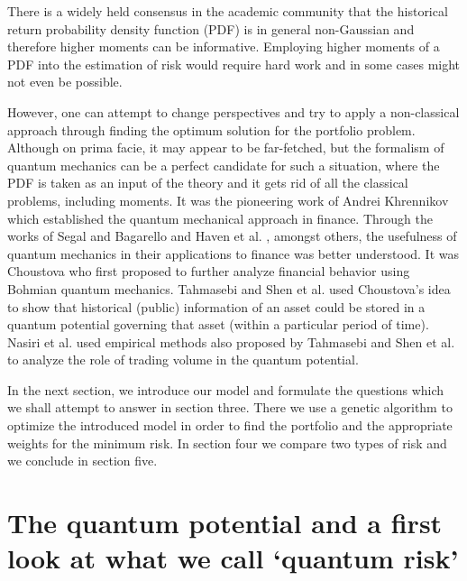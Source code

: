 \documentclass[journal,article,submit,moreauthors,pdftex]{Definitions/mdpi}
\begin{document}
There is a widely held consensus in the academic community that the
historical return probability density function (PDF) is in general
non-Gaussian and therefore higher moments can be informative. Employing
higher moments of a PDF into the estimation of risk would require hard work
and in some cases might not even be possible.

However, one can attempt to change perspectives and try to apply a
non-classical approach through finding the optimum solution for the
portfolio problem. Although on prima facie, it may appear to be far-fetched,
but the formalism of quantum mechanics can be a perfect candidate for such a
situation, where the PDF is taken as an input of the theory and it gets rid
of all the classical problems, including moments. It was the pioneering work
of Andrei Khrennikov \cite{AKhrennikov1}\cite{AKhrennikov2} which
established the quantum mechanical approach in finance. Through the works of
Segal \cite{Segal} and Bagarello \cite{FBagarello1}\cite{FBagarello2} and
Haven et al. \cite{Haven}, amongst others, the usefulness of quantum
mechanics in their applications to finance was better understood. It was
Choustova \cite{Choustova1} who first proposed to further analyze financial
behavior using Bohmian quantum mechanics. Tahmasebi \cite{Tahmasebi} and
Shen et al.\cite{Shen} used Choustova's idea to show that historical
(public) information of an asset could be stored in a quantum potential
governing that asset (within a particular period of time). Nasiri et al.\cite%
{Nasiri1}\cite{Nasiri2} used empirical methods also proposed by Tahmasebi
and Shen et al. \cite{Shen} to analyze the role of trading volume in the
quantum potential.

In the next section, we introduce our model and formulate the questions
which we shall attempt to answer in section three. There we use a genetic
algorithm to optimize the introduced model in order to find the portfolio
and the appropriate weights for the minimum risk. In section four we compare
two types of risk and we conclude in section five.
 


\section{The quantum potential and a first look at what we call `quantum
	risk' }
\end{document}
